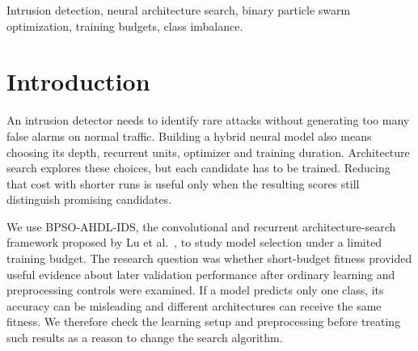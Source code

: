 \begin{abstract}
Neural architecture search for intrusion detection requires useful evaluation under limited compute. This project retains a 73-bit BPSO CNN--RNN framework and investigates multi-fidelity allocation on real Gas Pipeline data. An earlier archive-based uncertainty-aware method reduced online GPU use but required 403.82 GPU seconds of predictor observations, eliminating end-to-end savings. We implement an archive-free candidate that begins as BPSO with successive halving and learns only from search-generated observations using architecture-disjoint, prequentially checked CPU prediction. In 42 fresh bounded runs across three seeds, archive-free full used 11.947 GPU seconds on average to reach validation macro-F1 target 0.6 or exhaust the cap, versus 16.824 for standard BPSO: 28.99\% less total GPU computation. Targets were attained in 2/3 versus 1/3 seeds. However, predictive promotion never activated in the short searches; results matched ordinary halving, and the measured saving is attributable to multi-fidelity fallback, not online uncertainty learning. DEHB reached 3/3 targets using 6.778 GPU seconds. All failed target runs were retained as censored. Existing test results use a development-known historical split. The work supports reproducible engineering and removal of archive overhead; superiority or novelty of uncertainty-aware optimization remains unsupported.
\end{abstract}
\begin{IEEEkeywords}
Intrusion detection, neural architecture search, binary particle swarm optimization, training budgets, class imbalance.
\end{IEEEkeywords}

\section{Introduction}
An intrusion detector needs to identify rare attacks without generating too many false alarms on normal traffic. Building a hybrid neural model also means choosing its depth, recurrent units, optimizer and training duration. Architecture search explores these choices, but each candidate has to be trained. Reducing that cost with shorter runs is useful only when the resulting scores still distinguish promising candidates.

We use BPSO-AHDL-IDS, the convolutional and recurrent architecture-search framework proposed by Lu et al.~\cite{lu2025}, to study model selection under a limited training budget. The research question was whether short-budget fitness provided useful evidence about later validation performance after ordinary learning and preprocessing controls were examined. If a model predicts only one class, its accuracy can be misleading and different architectures can receive the same fitness. We therefore check the learning setup and preprocessing before treating such results as a reason to change the search algorithm.

